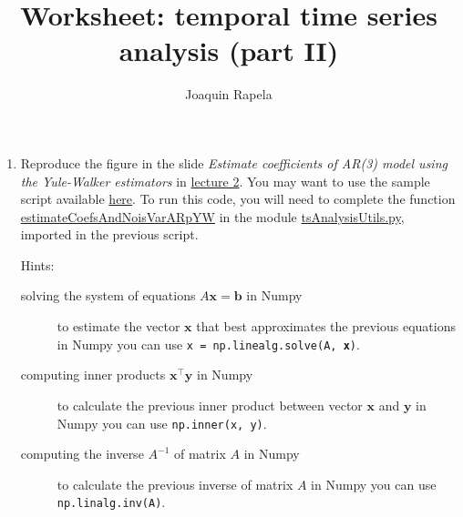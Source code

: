 \documentclass[12pt]{article}
\title{Worksheet: temporal time series analysis (part II)}
\author{Joaquin Rapela}
\begin{document}
\maketitle

\begin{enumerate}

    \item Reproduce the figure in the slide \emph{Estimate coefficients of
        AR(3) model using the Yule-Walker estimators} in
        \href{https://github.com/joacorapela/statNeuro2025/blob/master/lectures/02_temporalTimeSeriesAnalysis/temporalTimeSeriesAnalysis.pdf}{lecture 2}. You may want to use the
        sample script available
        \href{https://github.com/joacorapela/statNeuro2025/blob/master/worksheets/02_temporalTimeSeriesAnalysis/plot_estimateCoefsAR3YW.py}{here}.
        To run this code, you will need to complete the function
        \href{https://github.com/joacorapela/statNeuro2025/blob/5c570ed3bbb4311d80c280fcb30c4a1ec26f5b53/worksheets/02_temporalTimeSeriesAnalysis/tsAnalysisUtils.py#L28}{estimateCoefsAndNoisVarARpYW} in
        the module
        \href{https://github.com/joacorapela/statNeuro2025/blob/master/worksheets/02_temporalTimeSeriesAnalysis/tsAnalysisUtils.py#L28}{tsAnalysisUtils.py},
        imported in the previous script.

        Hints:

        \begin{description}

            \item[solving the system of equations $A\mathbf{x}=\mathbf{b}$ in
                Numpy] to estimate the vector $\mathbf{x}$ that best
                approximates the previous equations in Numpy you can use
                \texttt{x = np.linealg.solve(A, \textbf{x})}.

            \item[computing inner products $\mathbf{x}^\intercal\mathbf{y}$ in
                Numpy] to calculate the previous inner product between vector
                $\mathbf{x}$ and $\mathbf{y}$ in Numpy you can use
                \texttt{np.inner(x, y)}.

            \item[computing the inverse $A^{-1}$ of matrix $A$ in Numpy] to
                calculate the previous inverse of matrix $A$ in Numpy you can
                use \texttt{np.linalg.inv(A)}.

        \end{description}

\end{enumerate}
\end{document}
